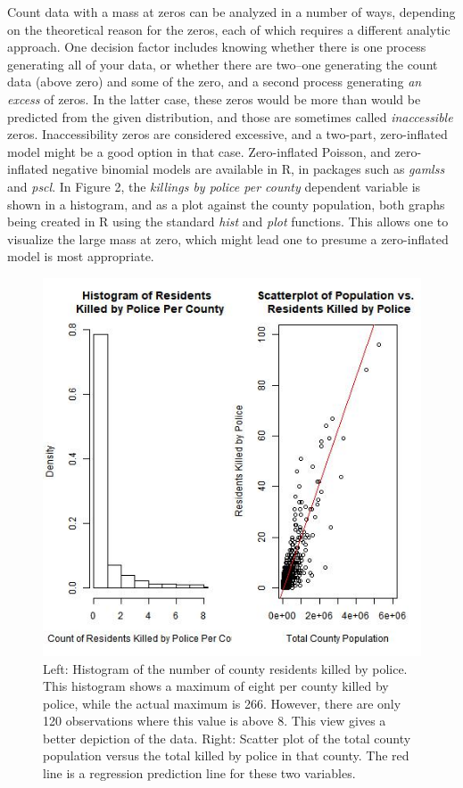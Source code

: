 \documentclass[sigconf]{acmart}
\begin{document}
Count data with a mass at zeros can be analyzed in a number of ways, depending on the theoretical reason for the zeros, each of which requires a different analytic approach.  One decision factor includes knowing whether there is one process generating all of your data, or whether there are two--one generating the count data (above zero) and some of the zero, and a second process generating {\em an excess} of zeros. \cite{neelon16,farewell17,min02,martin17}  In the latter case, these zeros would be more than would be predicted from the given distribution, and those are sometimes called {\em inaccessible} zeros.  Inaccessibility zeros are considered excessive, and a two-part, zero-inflated model might be a good option in that case.  Zero-inflated Poisson, and zero-inflated negative binomial models are available in R, in packages such as {\em gamlss} and {\em pscl}. \cite{gamlss} In Figure 2, the {\em killings by police per county} dependent variable is shown in a histogram, and as a plot against the county population, both graphs being created in R using the standard {\em hist} and {\em plot} functions.  This allows one to visualize the large mass at zero, which might lead one to presume a zero-inflated model is most appropriate.

\begin{figure}
\includegraphics[width=1.0\textwidth]{images/figure2.jpg}
\caption{Left: Histogram of the number of county residents killed by police.  This histogram shows a maximum of eight per county killed by police, while the actual maximum is 266.  However, there are only 120 observations where this value is above 8.  This view gives a better depiction of the data.  Right: Scatter plot of the total county population versus the total killed by police in that county.  The red line is a regression prediction line for these two variables.}
\end{figure}
\end{document}
